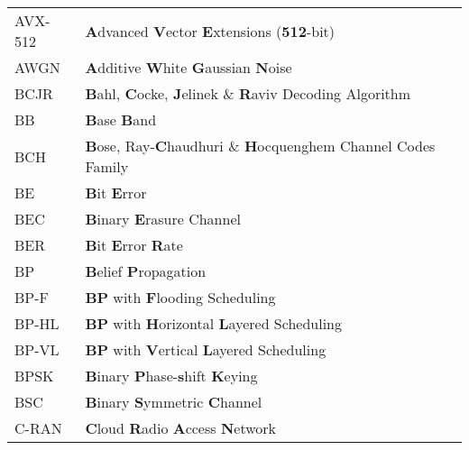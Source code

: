 \begin{center}
\begin{longtable}{ p{}  p{} }
		AVX-512 & \textbf{A}dvanced \textbf{V}ector \textbf{E}xtensions (\textbf{512}-bit)                                        \\
		AWGN    & \textbf{A}dditive \textbf{W}hite \textbf{G}aussian \textbf{N}oise                                               \\
		BCJR    & \textbf{B}ahl, \textbf{C}ocke, \textbf{J}elinek \& \textbf{R}aviv Decoding Algorithm                            \\
		BB      & \textbf{B}ase \textbf{B}and                                                                                     \\
		BCH     & \textbf{B}ose, Ray-\textbf{C}haudhuri \& \textbf{H}ocquenghem Channel Codes Family                              \\
		BE      & \textbf{B}it \textbf{E}rror                                                                                     \\
		BEC     & \textbf{B}inary \textbf{E}rasure Channel                                                                        \\
		BER     & \textbf{B}it \textbf{E}rror \textbf{R}ate                                                                       \\
		BP      & \textbf{B}elief \textbf{P}ropagation                                                                            \\
		BP-F    & \textbf{BP} with \textbf{F}looding Scheduling                                                                   \\
		BP-HL   & \textbf{BP} with \textbf{H}orizontal \textbf{L}ayered Scheduling                                                \\
		BP-VL   & \textbf{BP} with \textbf{V}ertical \textbf{L}ayered Scheduling                                                  \\
		BPSK    & \textbf{B}inary \textbf{P}hase-\textbf{s}hift \textbf{K}eying                                                   \\
		BSC     & \textbf{B}inary \textbf{S}ymmetric \textbf{C}hannel                                                             \\
		C-RAN   & \textbf{C}loud \textbf{R}adio \textbf{A}ccess \textbf{N}etwork                                                  \\

\end{longtable}
\end{center}
